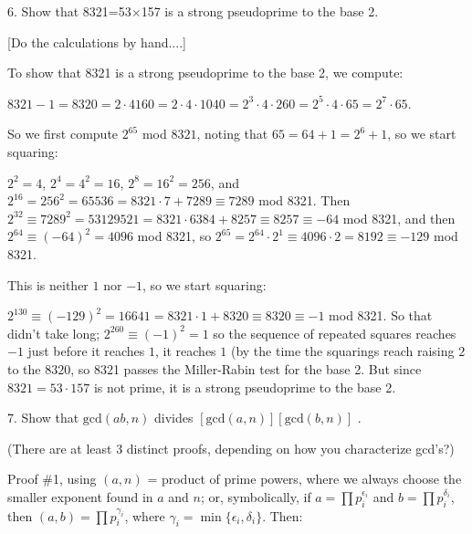 \bsk

\item{6.} Show that 8321=53$\times$157 is a strong pseudoprime to the base 2.

\item{} [Do the calculations by hand....]

\bsk

\item{} To show that 8321 is a strong pseudoprime to the base 2, we compute:

\item{} $8321-1 = 8320 = 2\cdot 4160 = 2\cdot 4\cdot 1040 = 2^3\cdot 4\cdot 260 = 
2^5\cdot 4\cdot 65 = 2^7\cdot 65$.

\item{} So we first compute $2^{65}$ mod $8321$, noting that $65=64+1=2^6+1$, so we start
squaring:

\item{} $2^2=4$, $2^4=4^2=16$, $2^8=16^2=256$, and $2^{16}=256^2=65536=8321\cdot 7+7289\equiv
7289$ mod 8321. Then $2^{32}\equiv 7289^2=53129521=8321\cdot 6384+8257\equiv 8257\equiv -64$ mod 8321,
and then $2^{64}\equiv (-64)^2=4096$ mod 8321, so $2^{65}=2^{64}\cdot 2^1\equiv 4096\cdot 2=8192\equiv -129$
mod 8321. 

\ssk

\item{} This is neither $1$ nor $-1$, so we start squaring:

\ssk

\item{} $2^{130}\equiv (-129)^2=16641=8321\cdot 1+8320\equiv 8320\equiv -1$ mod 8321.
So that didn't take long; $2^{260}\equiv (-1)^2=1$ so the sequence of repeated squares
reaches $-1$ just before it reaches $1$,  it reaches $1$ (by the time 
the squarings reach raising $2$ to the $8320$, so 8321 passes the Miller-Rabin test
for the base 2. But since $8321=53\cdot 157$ is not prime, it is a strong pseudoprime
to the base 2.

\bsk

\item{7.} Show that $\text{gcd}(ab,n)$ divides $[\text{gcd}(a,n)][\text{gcd}(b,n)]$ .

\ssk

\item{} (There are at least 3 distinct proofs, depending on how you characterize gcd's?)

\bsk

\item{} Proof \#1, using $(a,n)$ = product of prime powers, where we always choose the
smaller exponent found in $a$ and $n$; or, symbolically, 
if $a=\prod p_i^{\epsilon_i}$ and $b=\prod p_i^{\delta_i}$, then 
$(a,b)=\prod p_i^{\gamma_i}$, where $\gamma_i=\min\{\epsilon_i,\delta_i\}$. Then:

